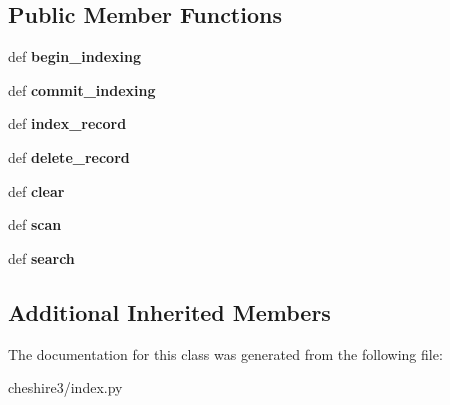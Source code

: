 \subsection*{Public Member Functions}
\begin{DoxyCompactItemize}
\item 
\hypertarget{classcheshire3_1_1index_1_1_reverse_metadata_index_a5a9824144f6dc7208b7443bcd3c49410}{def {\bfseries begin\-\_\-indexing}}\label{classcheshire3_1_1index_1_1_reverse_metadata_index_a5a9824144f6dc7208b7443bcd3c49410}

\item 
\hypertarget{classcheshire3_1_1index_1_1_reverse_metadata_index_a11fbb8b257c5dfab3e2a07ebba10c9a4}{def {\bfseries commit\-\_\-indexing}}\label{classcheshire3_1_1index_1_1_reverse_metadata_index_a11fbb8b257c5dfab3e2a07ebba10c9a4}

\item 
\hypertarget{classcheshire3_1_1index_1_1_reverse_metadata_index_a87072e4ce999e49acb33d118efd04679}{def {\bfseries index\-\_\-record}}\label{classcheshire3_1_1index_1_1_reverse_metadata_index_a87072e4ce999e49acb33d118efd04679}

\item 
\hypertarget{classcheshire3_1_1index_1_1_reverse_metadata_index_a692d759b5fb9b77ca144d04c2d72cbaa}{def {\bfseries delete\-\_\-record}}\label{classcheshire3_1_1index_1_1_reverse_metadata_index_a692d759b5fb9b77ca144d04c2d72cbaa}

\item 
\hypertarget{classcheshire3_1_1index_1_1_reverse_metadata_index_a0307d19f2be19026fbe69e8caae94dc1}{def {\bfseries clear}}\label{classcheshire3_1_1index_1_1_reverse_metadata_index_a0307d19f2be19026fbe69e8caae94dc1}

\item 
\hypertarget{classcheshire3_1_1index_1_1_reverse_metadata_index_a2c2e5e21bdee4deb42ac7e7f16bb64ff}{def {\bfseries scan}}\label{classcheshire3_1_1index_1_1_reverse_metadata_index_a2c2e5e21bdee4deb42ac7e7f16bb64ff}

\item 
\hypertarget{classcheshire3_1_1index_1_1_reverse_metadata_index_a899a6c3b912e9c533fc94ea8a42842ae}{def {\bfseries search}}\label{classcheshire3_1_1index_1_1_reverse_metadata_index_a899a6c3b912e9c533fc94ea8a42842ae}

\end{DoxyCompactItemize}
\subsection*{Additional Inherited Members}


The documentation for this class was generated from the following file\-:\begin{DoxyCompactItemize}
\item 
cheshire3/index.\-py\end{DoxyCompactItemize}
